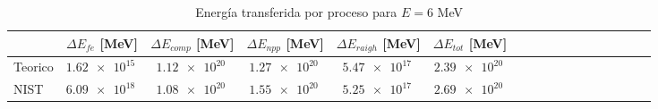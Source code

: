 \begin{table}
\caption{Energía transferida por proceso para $E=6$ MeV}
\begin{tabular}{lcccccccccccccccc}
\toprule
 & $\Delta E_{fe}$ [MeV] & $\Delta E_{comp}$ [MeV] & $\Delta E_{npp}$ [MeV] & $\Delta E_{raigh}$ [MeV] & $\Delta E_{tot}$ [MeV] \\
\midrule
Teorico & $\SI{1.62e+15}{}$ & $\SI{1.12e+20}{}$ & $\SI{1.27e+20}{}$ & $\SI{5.47e+17}{}$ & $\SI{2.39e+20}{}$ \\
NIST & $\SI{6.09e+18}{}$ & $\SI{1.08e+20}{}$ & $\SI{1.55e+20}{}$ & $\SI{5.25e+17}{}$ & $\SI{2.69e+20}{}$ \\
\bottomrule
\end{tabular}
\end{table}
